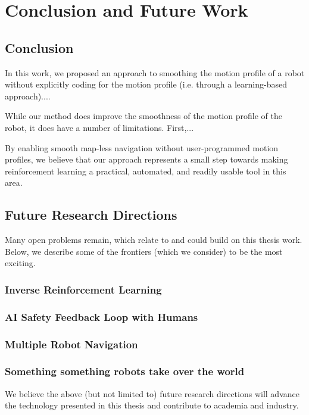 \chapter{Conclusion and Future Work}
\label{ch:concl}

\section{Conclusion}

In this work, we proposed an approach to smoothing the motion profile of a robot without explicitly coding for the motion profile (i.e. through a learning-based approach)....

While our method does improve the smoothness of the motion profile of the robot, it does have a number of limitations. First,... 

By enabling smooth map-less navigation without user-programmed motion profiles, we believe that our approach represents a small step towards making reinforcement learning a practical, automated, and readily usable tool in this area. 

\section{Future Research Directions}
Many open problems remain, which relate to and could build on this thesis work. Below, we describe some of the frontiers (which we consider) to be the most exciting.

\subsection{Inverse Reinforcement Learning}

\lipsum[5]

\subsection{AI Safety Feedback Loop with Humans}

\lipsum[6]

\subsection{Multiple Robot Navigation}

\lipsum[6]

\subsection{Something something robots take over the world}

\lipsum[6]

\vspace{2em}
We believe the above (but not limited to) future research directions will advance the technology presented in this thesis and contribute to academia and industry.
